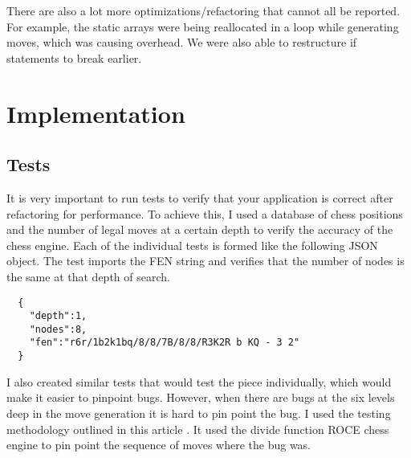 \documentclass[sigconf]{acmart}
\begin{document}
There are also a lot more optimizations/refactoring that cannot all be reported.
For example, the static arrays were being reallocated in a loop while generating moves, which was causing overhead.
We were also able to restructure if statements to break earlier.

\section{Implementation}
\subsection{Tests}
It is very important to run tests to verify that your application is correct after refactoring for performance.
To achieve this, I used a database of chess positions \cite{jones} and the number of legal moves at a certain depth to verify the accuracy of the chess engine.
Each of the individual tests is formed like the following JSON object.
The test imports the FEN \cite{fen} string and verifies that the number of nodes is the same at that depth of search.
\begin{verbatim}
  {
    "depth":1,
    "nodes":8,
    "fen":"r6r/1b2k1bq/8/8/7B/8/8/R3K2R b KQ - 3 2"
  }
\end{verbatim}
I also created similar tests that would test the piece individually, which would make it easier to pinpoint bugs.
However, when there are bugs at the six levels deep in the move generation it is hard to pin point the bug.
I used the testing methodology outlined in this article \cite{testing}.
It used the divide function ROCE chess engine to pin point the sequence of moves where the bug was.
\end{document}
